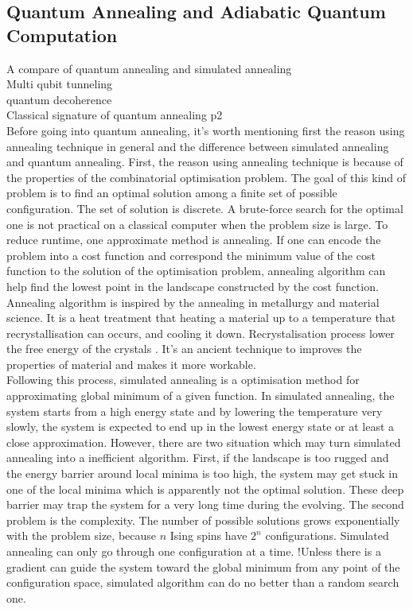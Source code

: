 \documentclass[twoside,a4paper,article]{combine}
\begin{document}
\subsection{Quantum Annealing and Adiabatic Quantum Computation}
\cite{Boixo2014} A compare of quantum annealing and simulated annealing \\
\cite{QABoixo2016} Multi qubit tunneling \\
\cite{Jin2013} quantum decoherence \\
\cite{Smolin2013} Classical signature of quantum annealing p2 \\

Before going into quantum annealing, it's worth mentioning first the reason using annealing technique in general and the difference between simulated annealing and quantum annealing. First, the reason using annealing technique is because of the properties of the combinatorial optimisation problem. The goal of this kind of problem is to find an optimal solution among a finite set of possible configuration. The set of solution is discrete. A brute-force search for the optimal one is not practical on a classical computer when the problem size is large. To reduce runtime, one approximate method is annealing. If one can encode the problem into a cost function and correspond the minimum value of the cost function to the solution of the optimisation problem, annealing algorithm can help find the lowest point in the landscape constructed by the cost function.  \\

Annealing algorithm is inspired by the annealing in metallurgy and material science. It is a heat treatment that heating a material up to a temperature that recrystallisation can occurs, and cooling it down. Recrystalisation process lower the free energy of the crystals \cite{Schader2012}. It's an ancient technique to improves the properties of material and makes it more workable. \\

Following this process, simulated annealing is a optimisation method for approximating global minimum of a given function. In simulated annealing, the system starts from a high energy state and by lowering the temperature very slowly, the system is expected to end up in the lowest energy state or at least a close approximation. However, there are two situation which may turn simulated annealing into a inefficient algorithm. First, if the landscape is too rugged and the energy barrier around local minima is too high, the system may get stuck in one of the local minima which is apparently not the optimal solution. These deep barrier may trap the system for a very long time during the evolving. The second problem is the complexity. The number of possible solutions grows exponentially with the problem size, because $n$ Ising spins have $2^n$ configurations. Simulated annealing can only go through one configuration at a time. !Unless there is a gradient can guide the system toward the global minimum from any point of the configuration space, simulated algorithm can do no better than a random search one. \\
\end{document}
